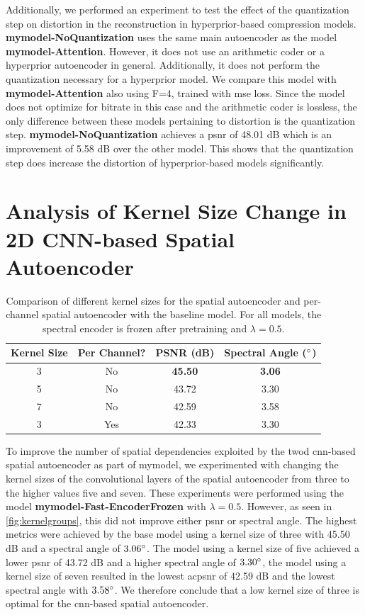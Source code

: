 Additionally, we performed an experiment to test the effect of the quantization step on distortion in the reconstruction in hyperprior-based compression models. \textbf{\ac{mymodel}-NoQuantization} uses the same main autoencoder as the model \textbf{\ac{mymodel}-Attention}. However, it does not use an arithmetic coder or a hyperprior autoencoder in general. Additionally, it does not perform the quantization necessary for a hyperprior model. We compare this model with \textbf{\ac{mymodel}-Attention} also using F=4, trained with \ac{mse} loss. Since the model does not optimize for bitrate in this case and the arithmetic coder is lossless, the only difference between these models pertaining to distortion is the quantization step. \textbf{\ac{mymodel}-NoQuantization} achieves a \ac{psnr} of 48.01 dB which is an improvement of 5.58 dB over the other model. This shows that the quantization step does increase the distortion of hyperprior-based models significantly.

\section[Analysis of Kernel Size Change]{Analysis of Kernel Size Change in 2D CNN-based Spatial Autoencoder}
\begin{table}
\centering
\caption{Comparison of different kernel sizes for the spatial autoencoder and per-channel spatial autoencoder with the baseline model. For all models, the spectral encoder is frozen after pretraining and $\lambda = 0.5$.}
\begin{tabular}{|c|c|c|c|}
\hline
Kernel Size & Per Channel? & PSNR (dB) & Spectral Angle ($\degree$) \\
\hline\hline
3 & No & \textbf{45.50} & \textbf{3.06} \\
\hline
5 & No & 43.72 & 3.30 \\
\hline
7 & No & 42.59 & 3.58 \\
\hline
3 & Yes & 42.33 & 3.30 \\
\hline
\end{tabular}
\label{fig:kernelgroups}
\end{table}

To improve the number of spatial dependencies exploited by the \ac{twod} \ac{cnn}-based spatial autoencoder as part of \ac{mymodel}, we experimented with changing the kernel sizes of the convolutional layers of the spatial autoencoder from three to the higher values five and seven. These experiments were performed using the model \textbf{\ac{mymodel}-Fast-EncoderFrozen} with $\lambda=0.5$. However, as seen in \autoref{fig:kernelgroups}, this did not improve either \ac{psnr} or spectral angle. The highest metrics were achieved by the base model using a kernel size of three with 45.50 dB and a spectral angle of $3.06 \degree$. The model using a kernel size of five achieved a lower \ac{psnr} of 43.72 dB and a higher spectral angle of $3.30 \degree$, the model using a kernel size of seven resulted in the lowest ac{psnr} of 42.59 dB and the lowest spectral angle with $3.58 \degree$. We therefore conclude that a low kernel size of three is optimal for the \ac{cnn}-based spatial autoencoder.

